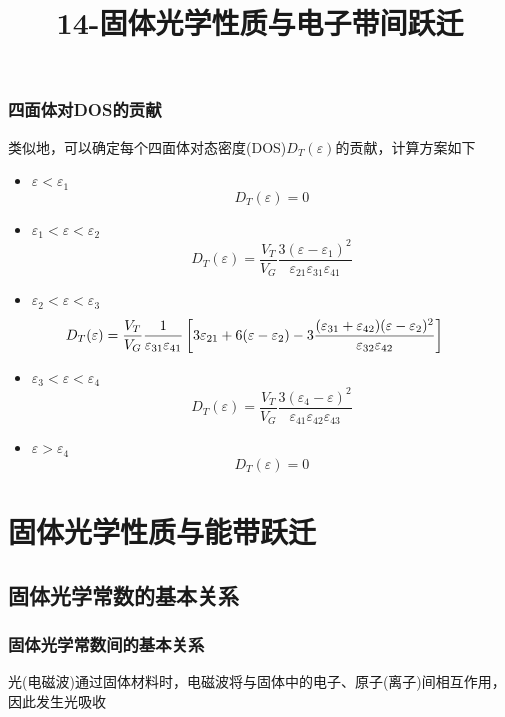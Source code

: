 {\frame
{
	\frametitle{四面体对\textrm{DOS}的贡献}
	类似地，可以确定每个四面体对态密度(\textrm{DOS})$D_T(\varepsilon)$的贡献，计算方案如下
	\begin{itemize}
	\item $\varepsilon<\varepsilon_1$
		\begin{displaymath}
			D_T(\varepsilon)=0
		\end{displaymath}
	\item $\varepsilon_1<\varepsilon<\varepsilon_2$
		\begin{displaymath}
			D_T(\varepsilon)=\dfrac{V_T}{V_G}\dfrac{3(\varepsilon-\varepsilon_1)^2}{\varepsilon_{21}\varepsilon_{31}\varepsilon_{41}}
		\end{displaymath}
	\item $\varepsilon_2<\varepsilon<\varepsilon_3$
		\begin{displaymath}
			\hspace*{-25pt}	D_T(\varepsilon)=\dfrac{V_T}{V_G}\dfrac1{\varepsilon_{31}\varepsilon_{41}}\left[3\varepsilon_{21}+6(\varepsilon-\varepsilon_2)-3\dfrac{(\varepsilon_{31}+\varepsilon_{42})(\varepsilon-\varepsilon_2)^2}{\varepsilon_{32}\varepsilon_{42}}\right]
		\end{displaymath}
	\item $\varepsilon_3<\varepsilon<\varepsilon_4$
		\begin{displaymath}
			D_T(\varepsilon)=\dfrac{V_T}{V_G}\dfrac{3(\varepsilon_4-\varepsilon)^2}{\varepsilon_{41}\varepsilon_{42}\varepsilon_{43}}
		\end{displaymath}
	\item $\varepsilon>\varepsilon_4$
		\begin{displaymath}
			D_T(\varepsilon)=0
		\end{displaymath}
	\end{itemize}
}

\title{14-固体光学性质与电子带间跃迁}
\section{固体光学性质与能带跃迁}
\subsection{固体光学常数的基本关系}
\frame
{
	\frametitle{固体光学常数间的基本关系}
	光(电磁波)通过固体材料时，电磁波将与固体中的电子、原子(离子)间相互作用，因此发生光吸收
\begin{figure}[h!]
	\vspace{-3pt}
\centering
{}
\caption{\fontsize{5.5pt}{4.2pt}}%
\label{Light-Wave}
\end{figure}
}

}
